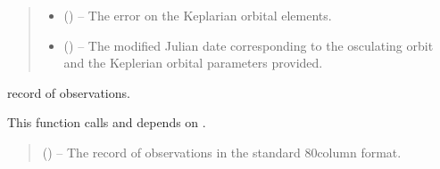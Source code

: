 \documentclass[letterpaper,11pt,english]{sphinxmanual}
\begin{document}
\begin{savenotes}
\begin{fulllineitems}
\begin{savenotes}
\begin{fulllineitems}
\begin{quote}
\begin{description}
\begin{itemize}
\item {} 
\sphinxAtStartPar
{} () – The error on the Keplarian orbital elements.

\item {} 
\sphinxAtStartPar
{} () – The modified Julian date corresponding to the osculating orbit and
the Keplerian orbital parameters provided.

\end{itemize}


\end{description}\end{quote}

\end{fulllineitems}\end{savenotes}


\begin{savenotes}\begin{fulllineitems}
\label{\detokenize{code/opihiexarata.orbit.orbfit:opihiexarata.orbit.orbfit.OrbfitOrbitDeterminerEngine.solve_orbit_via_record}}
\pysigstartsignatures
{}
\pysigstopsignatures\begin{description}
\sphinxAtStartPar
record of observations.

\end{description}

\sphinxAtStartPar
This function calls and depends on .
\begin{quote}\begin{description}
\sphinxAtStartPar
{} () – The record of observations in the standard 80\sphinxhyphen{}column format.


\end{description}
\end{quote}
\end{fulllineitems}
\end{savenotes}
\end{fulllineitems}
\end{savenotes}
\end{document}

